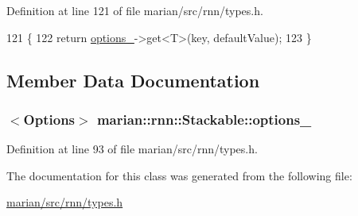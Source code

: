 Definition at line 121 of file marian/src/rnn/types.\+h.


\begin{DoxyCode}
121                                               \{
122     \textcolor{keywordflow}{return} \hyperlink{classmarian_1_1rnn_1_1Stackable_a8d4661b0e78935359f7a1bb764f44dec}{options\_}->get<T>(key, defaultValue);
123   \}
\end{DoxyCode}


\subsection{Member Data Documentation}
\subsubsection[{\texorpdfstring{options\+\_\+}{options_}}]{$<${\bf Options}$>$ marian\+::rnn\+::\+Stackable\+::options\+\_\+\hspace{0.3cm}{\ttfamily [protected]}}\hypertarget{classmarian_1_1rnn_1_1Stackable_a8d4661b0e78935359f7a1bb764f44dec}{}\label{classmarian_1_1rnn_1_1Stackable_a8d4661b0e78935359f7a1bb764f44dec}


Definition at line 93 of file marian/src/rnn/types.\+h.



The documentation for this class was generated from the following file\+:\begin{DoxyCompactItemize}
\item 
\hyperlink{marian_2src_2rnn_2types_8h}{marian/src/rnn/types.\+h}\end{DoxyCompactItemize}
